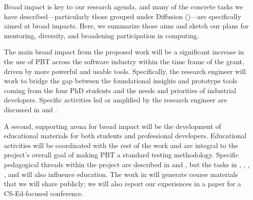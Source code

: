 
\immediate\closeout\workplanfile






Broad impact is key to our research agenda, and many of the concrete
tasks we have described---particularly those grouped under Diffusion
()---are specifically aimed at broad
impacts.  Here, we summarize those aims and sketch our plans for
mentoring, diversity, and broadening participation in computing.

\smallskip
{} The main broad impact from the
proposed work will be a significant increase in the use of PBT across
the software industry within the time frame of the grant, driven
by more powerful and usable tools. Specifically, the research engineer will work to
bridge the gap between the foundational insights and prototype tools
coming from the four PhD students and the needs and priorities of
industrial developers.
Specific activities led or amplified by the research engineer are discussed in
 and .

\smallskip
{}
%
A second, supporting arena for broad impact will be the
development of educational materials for both students and
professional developers. Educational activities will be
coordinated with the rest of the work and are integral to the
project's overall goal of making PBT a standard testing methodology.
Specific pedagogical
threads within the project are described in  and , but the
tasks in , ,
, , and
 will also influence education. The
work in  will generate course materials that we will
share publicly; we will also report our experiences in a paper for a
CS-Ed-focused conference.

